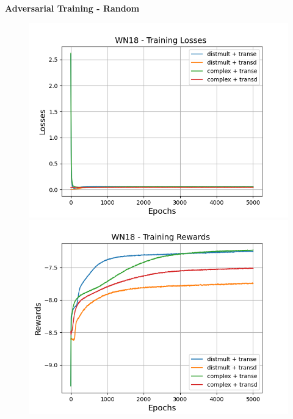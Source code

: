 \textbf{Adversarial Training - Random}\\
\begin{figure}
    \centering
    \begin{minipage}{.5\textwidth}
      \centering
      \includegraphics[width=0.9\linewidth]{figures/results/gan_train/pretrained/random/wn18/gan_train_random_wn18_losses.png}
    \end{minipage}%
    \begin{minipage}{.5\textwidth}
      \centering
      \includegraphics[width=0.9\linewidth]{figures/results/gan_train/pretrained/random/wn18/gan_train_random_wn18_rewards.png}
    \end{minipage}
    \begin{minipage}{.5\textwidth}
      \centering

\end{minipage}
\end{figure}
